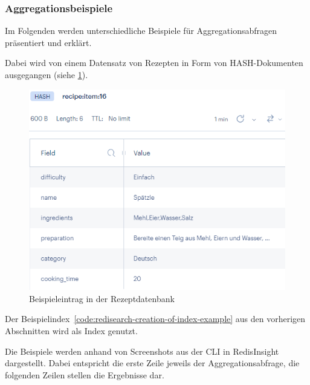 \subsubsection{Aggregationsbeispiele}
Im Folgenden werden unterschiedliche Beispiele für Aggregationsabfragen präsentiert und erklärt.

Dabei wird von einem Datensatz von Rezepten in Form von HASH-Dokumenten ausgegangen (siehe \cref{pic:redisearch-aggregation-example-entry}).

\begin{figure}[hp]  %
    \centering      %
    \includegraphics[width=1\textwidth]{pictures/redis/redisearch_aggregation_example_entry.png}
    \caption{Beispieleintrag in der Rezeptdatenbank}      %
    \label{pic:redisearch-aggregation-example-entry}    %
\end{figure}

Der Beispielindex~\ref{code:redisearch-creation-of-index-example} aus den vorherigen Abschnitten  wird als Index genutzt.


Die Beispiele werden anhand von Screenshots aus der CLI in RedisInsight dargestellt. Dabei entspricht die erste Zeile jeweils der Aggregationsabfrage, die folgenden Zeilen stellen die Ergebnisse dar.



